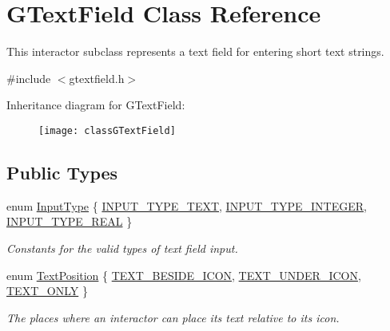 \hypertarget{classGTextField}{}\section{G\+Text\+Field Class Reference}
\label{classGTextField}


This interactor subclass represents a text field for entering short text strings.  




{\ttfamily \#include $<$gtextfield.\+h$>$}

Inheritance diagram for G\+Text\+Field\+:\begin{figure}[H]
\begin{center}
\leavevmode
\texttt{[image: classGTextField]}
\end{center}
\end{figure}
\subsection*{Public Types}
\begin{DoxyCompactItemize}
\item 
enum \mbox{\hyperlink{classGTextField_a5fc772c800c3d40d2b95564e8a839bab}{Input\+Type}} \{ \mbox{\hyperlink{classGTextField_a5fc772c800c3d40d2b95564e8a839babadbd6303eaf17fd7715ddca85f2ac3287}{I\+N\+P\+U\+T\+\_\+\+T\+Y\+P\+E\+\_\+\+T\+E\+XT}}, 
\mbox{\hyperlink{classGTextField_a5fc772c800c3d40d2b95564e8a839babac37563ad86c1ac752795ed59e700be77}{I\+N\+P\+U\+T\+\_\+\+T\+Y\+P\+E\+\_\+\+I\+N\+T\+E\+G\+ER}}, 
\mbox{\hyperlink{classGTextField_a5fc772c800c3d40d2b95564e8a839babab760f99baafaf18281fa72664f303938}{I\+N\+P\+U\+T\+\_\+\+T\+Y\+P\+E\+\_\+\+R\+E\+AL}}
 \}
\begin{DoxyCompactList}\small\item\em Constants for the valid types of text field input. \end{DoxyCompactList}\item 
enum \mbox{\hyperlink{classGInteractor_a8e0d441725a81d2bbdebbea09078260e}{Text\+Position}} \{ \mbox{\hyperlink{classGInteractor_a8e0d441725a81d2bbdebbea09078260ea4cd6f2e7d5a08d6f4dc052df2358f774}{T\+E\+X\+T\+\_\+\+B\+E\+S\+I\+D\+E\+\_\+\+I\+C\+ON}}, 
\mbox{\hyperlink{classGInteractor_a8e0d441725a81d2bbdebbea09078260eaa88490f63d8de68d44c83bdb2ecde3b3}{T\+E\+X\+T\+\_\+\+U\+N\+D\+E\+R\+\_\+\+I\+C\+ON}}, 
\mbox{\hyperlink{classGInteractor_a8e0d441725a81d2bbdebbea09078260ea39a6f388a30ac4fefb6eb13e846bc9f2}{T\+E\+X\+T\+\_\+\+O\+N\+LY}}
 \}
\begin{DoxyCompactList}\small\item\em The places where an interactor can place its text relative to its icon. \end{DoxyCompactList}\end{DoxyCompactItemize}
